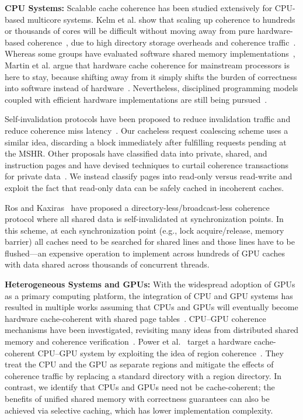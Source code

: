 \textbf{CPU Systems:} Scalable cache coherence has been studied extensively for CPU-based
 multicore systems. Kelm et al. show that scaling up coherence to hundreds
or thousands of cores will be difficult without moving away from pure
hardware-based coherence~\cite{Kelm2009,Hill92}, due to high directory storage
overheads and coherence traffic~\cite{Lebeck95,Cheng06}.  
Whereas some groups have
evaluated software shared memory implementations~\cite{Falsafi94,Hill92}, Martin
et al. argue that hardware cache coherence for mainstream processors is here to
stay, because shifting away from it simply shifts the burden of correctness into
software instead of hardware~\cite{Martin2012}. Nevertheless, disciplined programming
models coupled with efficient hardware implementations are still being pursued~\cite{choi2011,Sung2013,Sung2015}.

Self-invalidation protocols have been proposed to reduce invalidation traffic and reduce
coherence miss latency~\cite{Lebeck95,Lai2000}. Our cacheless request coalescing scheme uses a similar idea,
discarding a block immediately after fulfilling requests pending at the MSHR.
Other proposals have classified data into private, shared, and
instruction pages and have devised techniques to curtail coherence transactions
for private data~\cite{Pugsley2010,Hardavellas2009,Cuesta2011,Ros2012}. We instead classify
pages into read-only versus read-write and exploit the fact that read-only data
can be safely cached in incoherent caches.

Ros and Kaxiras~\cite{Ros2012} have proposed a
directory\hyp{}less\slash{}broadcast\hyp{}less coherence protocol where all shared
data is self\hyp{}invalidated at synchronization points. In this scheme,
at each synchronization point (e.g., lock acquire/release, memory barrier) all
caches need to be searched for shared lines and those lines have to be
flushed---an expensive operation to implement across hundreds of GPU caches with data
shared across thousands of concurrent threads.

\textbf{Heterogeneous Systems and GPUs:} With the widespread adoption of GPUs as a primary
computing platform, the integration of CPU and GPU systems has
resulted in multiple works assuming that CPUs and GPUs will eventually become
hardware cache-coherent with shared page
tables~\cite{Power2014,Pichai2014,Agarwal2015,Agarwal2015b}.  CPU--GPU coherence
mechanisms have been investigated, revisiting many ideas from distributed shared
memory and coherence verification~\cite{Gelado2010,Power2013,wu2014,Kaxiras2013}. Power et
al.~\cite{Power2013} target a hardware cache-coherent CPU--GPU system by
exploiting the idea of region
coherence~\cite{Cantin2005,Alisafaee2012,Moshovos2005,Zebchuk2007}. They treat the CPU and the
GPU as separate regions and mitigate the effects of coherence traffic by
replacing a standard directory with a region directory. 
In contrast, we identify that CPUs and GPUs need not be cache-coherent; 
the benefits of unified shared memory with correctness guarantees can also be achieved via selective caching, which has lower
implementation complexity.

